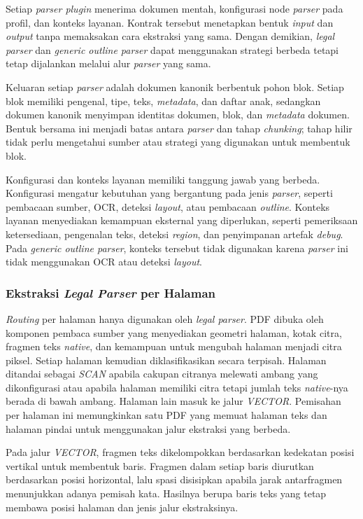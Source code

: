 Setiap \textit{parser plugin} menerima dokumen mentah, konfigurasi node \textit{parser} pada profil, dan konteks layanan.
Kontrak tersebut menetapkan bentuk \textit{input} dan \textit{output} tanpa memaksakan cara ekstraksi yang sama.
Dengan demikian, \textit{legal parser} dan \textit{generic outline parser} dapat menggunakan strategi berbeda tetapi tetap dijalankan melalui alur \textit{parser} yang sama.

Keluaran setiap \textit{parser} adalah dokumen kanonik berbentuk pohon blok.
Setiap blok memiliki pengenal, tipe, teks, \textit{metadata}, dan daftar anak, sedangkan dokumen kanonik menyimpan identitas dokumen, blok, dan \textit{metadata} dokumen.
Bentuk bersama ini menjadi batas antara \textit{parser} dan tahap \textit{chunking}; tahap hilir tidak perlu mengetahui sumber atau strategi yang digunakan untuk membentuk blok.

Konfigurasi dan konteks layanan memiliki tanggung jawab yang berbeda.
Konfigurasi mengatur kebutuhan yang bergantung pada jenis \textit{parser}, seperti pembacaan sumber, OCR, deteksi \textit{layout}, atau pembacaan \textit{outline}.
Konteks layanan menyediakan kemampuan eksternal yang diperlukan, seperti pemeriksaan ketersediaan, pengenalan teks, deteksi \textit{region}, dan penyimpanan artefak \textit{debug}.
Pada \textit{generic outline parser}, konteks tersebut tidak digunakan karena \textit{parser} ini tidak menggunakan OCR atau deteksi \textit{layout}.

\subsubsection{Ekstraksi \textit{Legal Parser} per Halaman}
\label{sec:solusi-routing-halaman}

\textit{Routing} per halaman hanya digunakan oleh \textit{legal parser}.
PDF dibuka oleh komponen pembaca sumber yang menyediakan geometri halaman, kotak citra, fragmen teks \textit{native}, dan kemampuan untuk mengubah halaman menjadi citra piksel.
Setiap halaman kemudian diklasifikasikan secara terpisah.
Halaman ditandai sebagai \textit{SCAN} apabila cakupan citranya melewati ambang yang dikonfigurasi atau apabila halaman memiliki citra tetapi jumlah teks \textit{native}-nya berada di bawah ambang.
Halaman lain masuk ke jalur \textit{VECTOR}.
Pemisahan per halaman ini memungkinkan satu PDF yang memuat halaman teks dan halaman pindai untuk menggunakan jalur ekstraksi yang berbeda.

Pada jalur \textit{VECTOR}, fragmen teks dikelompokkan berdasarkan kedekatan posisi vertikal untuk membentuk baris.
Fragmen dalam setiap baris diurutkan berdasarkan posisi horizontal, lalu spasi disisipkan apabila jarak antarfragmen menunjukkan adanya pemisah kata.
Hasilnya berupa baris teks yang tetap membawa posisi halaman dan jenis jalur ekstraksinya.


